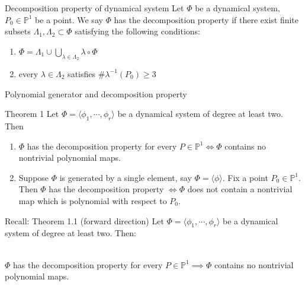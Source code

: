 \documentclass[aspectratio=169,xcolor=dvipsnames]{beamer}
\begin{document}
\begin{frame}{Decomposition property of dynamical system}
    Let $\Phi$ be a dynamical system, $P_0\in \mathbb{P}^1$ be a point. We say $\Phi$ has the decomposition property if there exist finite subsets $\Lambda_1, \Lambda_2 \subset \Phi$ satisfying the following conditions:
    \begin{enumerate}
        \item $\displaystyle \Phi = \Lambda_1 \cup \bigcup_{\lambda\in\Lambda_2}\lambda\circ \Phi$
        \item every $\lambda \in \Lambda_2$ satisfies $\#\lambda^{-1}(P_0) \geq 3$
    \end{enumerate}
\end{frame}
\begin{frame}{Polynomial generator and decomposition property}
    \begin{block}{Theorem 1}
        Let $\Phi = \langle \phi_1,\cdots,\phi_r\rangle$ be a dynamical system of degree at least two. Then
        \begin{enumerate}
            \item $\Phi$ has the decomposition property for every $P\in \mathbb{P}^1 \iff \Phi$ contains no nontrivial polynomial maps.
            \item Suppose $\Phi$ is generated by a single element, say $\Phi = \langle \phi \rangle$. Fix a point $P_0\in \mathbb{P}^1$. Then $\Phi$ has the decomposition property $\iff \Phi$ does not contain a nontrivial map which is polynomial with respect to $P_0$. 
        \end{enumerate}
    \end{block}
\end{frame}
\begin{frame}
    \begin{block}{Recall: Theorem 1.1 (forward direction)}
         Let $\Phi = \langle \phi_1,\cdots,\phi_r\rangle$ be a dynamical system of degree at least two. Then:\\~

            $\Phi$ has the decomposition property for every $P\in \mathbb{P}^1 \implies \Phi$ contains no nontrivial polynomial maps.
    \end{block}
\end{frame}
\end{document}
